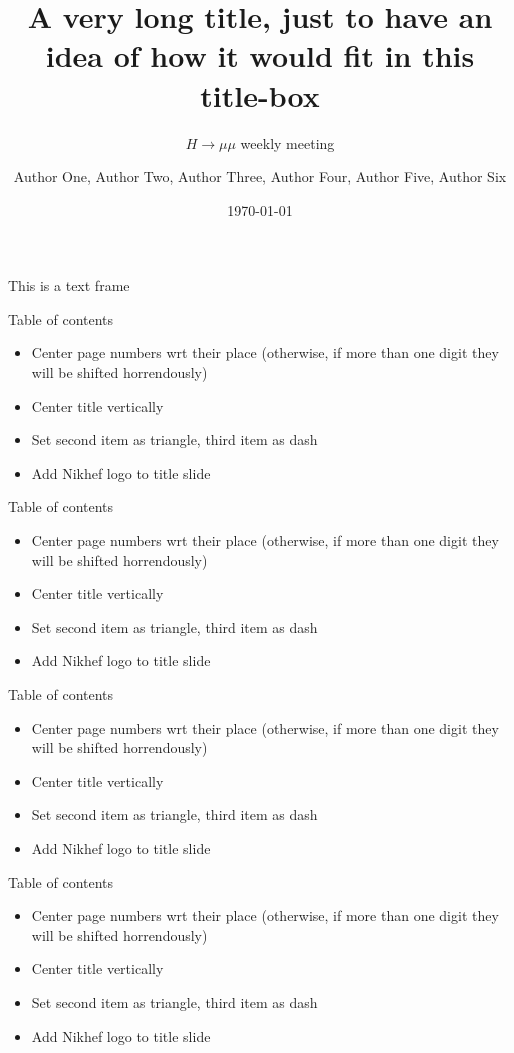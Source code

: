 \documentclass{beamer}
\author{Author One, Author Two, Author Three, Author Four, Author Five, Author Six}
\title{A very long title, just to have an idea of how it would fit in this title-box}
\subtitle{\texorpdfstring{$H\!\!\to\!\!\mu\mu $ weekly meeting}{Hmumu weekly meeting}}
\institute{example University}
\date{\today}
\begin{document}
\frame{\maketitle}

\begin{frame}{This is a text frame}
\lipsum[2]
\end{frame}

\begin{frame}{Table of contents}
	\begin{itemize}
		\item Center page numbers wrt their place (otherwise, if more than one digit they will be shifted horrendously)
		\item Center title vertically
		\item Set second item as triangle, third item as dash
		\item Add Nikhef logo to title slide
	\end{itemize}
\end{frame}

\begin{frame}{Table of contents}
	\begin{itemize}
		\item Center page numbers wrt their place (otherwise, if more than one digit they will be shifted horrendously)
		\item Center title vertically
		\item Set second item as triangle, third item as dash
		\item Add Nikhef logo to title slide
	\end{itemize}
\end{frame}

\begin{frame}{Table of contents}
	\begin{itemize}
		\item Center page numbers wrt their place (otherwise, if more than one digit they will be shifted horrendously)
		\item Center title vertically
		\item Set second item as triangle, third item as dash
		\item Add Nikhef logo to title slide
	\end{itemize}
\end{frame}

\begin{frame}{Table of contents}
	\begin{itemize}
		\item Center page numbers wrt their place (otherwise, if more than one digit they will be shifted horrendously)
		\item Center title vertically
		\item Set second item as triangle, third item as dash
		\item Add Nikhef logo to title slide
	\end{itemize}
\end{frame}
\end{document}
